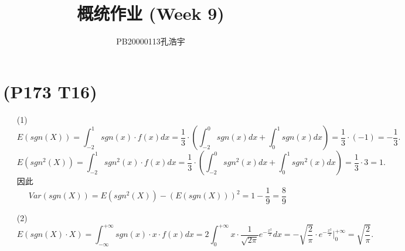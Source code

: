 \documentclass{article}
\title{概统作业 (Week 9)}
\author{PB20000113孔浩宇}
\begin{document}
\maketitle
\section{(P173 T16)}  %
\begin{enumerate}
    \item [(1)]
    \[
        E(sgn (X)) 
        = \int_{-2}^{1} sgn(x)\cdot f(x) dx
        = \frac{1}{3}\cdot \left(\int_{-2}^{0}sgn(x) dx + \int_{0}^{1} sgn(x) dx\right) 
        = \frac{1}{3} \cdot (-1)
        = -\frac{1}{3}.   
    \]
    \[
        E({sgn}^2 (X))
        = \int_{-2}^{1} {sgn}^2 (x) \cdot f(x) dx
        = \frac{1}{3} \cdot \left(\int_{-2}^{0} {sgn}^{2}(x) dx  + \int_{0}^{1} {sgn}^{2} (x) dx \right)
        = \frac{1}{3} \cdot 3
        = 1.
    \]
    因此
    \[
        Var(sgn(X))
        = E({sgn}^2 (X)) - {\left(E(sgn(X))\right)}^2  
        = 1 - \frac{1}{9}
        = \frac{8}{9} 
    \]
    \item [(2)]
    \[
        E(sgn(X) \cdot X)
        = \int_{-\infty}^{+\infty} sgn(x) \cdot x \cdot f(x) dx    
        = 2 \int_{0}^{+\infty} x \cdot \frac{1}{\sqrt{2\pi}} e^{-\frac{x^2}{2}} dx
        = - \sqrt{\frac{2}{\pi}} \cdot e^{-\frac{x^2}{2}} \big| _{0}^{+\infty}
        = \sqrt{\frac{2}{\pi}}.
    \]
\end{enumerate}
\end{document}
